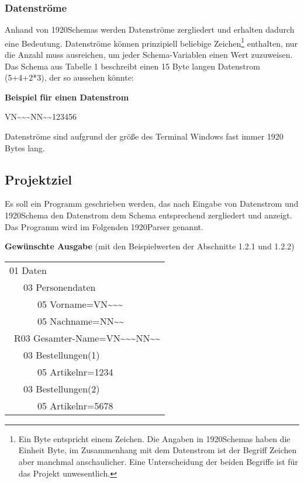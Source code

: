 \subsubsection{Datenströme}
Anhand von 1920Schemas werden Datenströme zergliedert und erhalten dadurch eine Bedeutung. Datenströme können prinzipiell beliebige Zeichen\footnote{Ein Byte entspricht einem Zeichen. Die Angaben in 1920Schemas haben die Einheit Byte, im Zusammenhang mit dem Datenstrom ist der Begriff Zeichen aber manchmal anschaulicher. Eine Unterscheidung der beiden Begriffe ist für das Projekt unwesentlich.} enthalten, nur die Anzahl muss ausreichen, um jeder Schema-Variablen einen Wert zuzuweisen. Das Schema aus Tabelle 1 beschreibt einen 15 Byte langen Datenstrom (5+4+2*3), der so aussehen könnte:

\textbf{Beispiel für einen Datenstrom}

VN\textasciitilde \textasciitilde \textasciitilde NN\textasciitilde\textasciitilde123456

Datenströme sind aufgrund der größe des Terminal Windows fast immer 1920 Bytes lang.


\subsection{Projektziel}
\label{sec:Projektziel}
Es soll ein Programm geschrieben werden, das nach Eingabe von Datenstrom und 1920Schema den Datenstrom dem Schema entsprechend zergliedert und anzeigt. Das Programm wird im Folgenden 1920Parser genannt.

\textbf{Gewünschte Ausgabe} (mit den Beispielwerten der Abschnitte 1.2.1 und 1.2.2)

\begin{tabularx}{0px}{l}
01 Daten\\
\ \ \ 03 Personendaten\\
\ \ \ \ \ \ 05 Vorname=VN\textasciitilde \textasciitilde \textasciitilde\\
\ \ \ \ \ \ 05 Nachname=NN\textasciitilde \textasciitilde\\
\ R03 Gesamter-Name=VN\textasciitilde \textasciitilde \textasciitilde NN\textasciitilde \textasciitilde\\
\ \ \ 03 Bestellungen(1)\\
\ \ \ \ \ \ 05 Artikelnr=1234\\
\ \ \ 03 Bestellungen(2)\\
\ \ \ \ \ \ 05 Artikelnr=5678\\
\end{tabularx}

